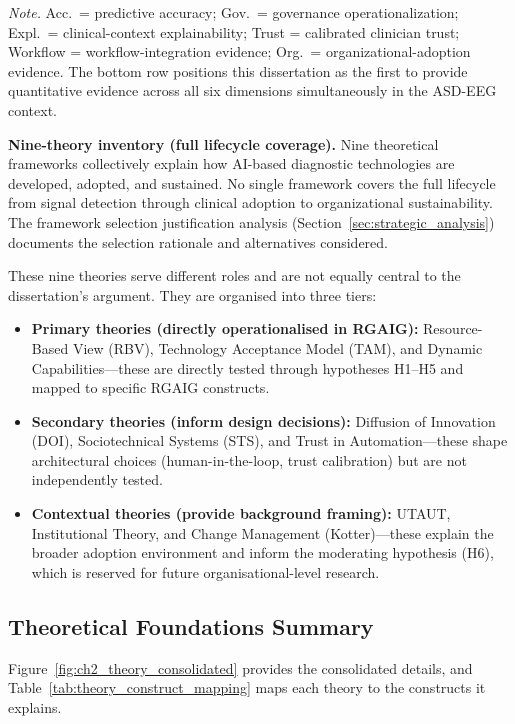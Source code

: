 \vspace{0.4em}
\noindent\textit{Note.} Acc.\ = predictive accuracy; Gov.\ = governance operationalization; Expl.\ = clinical-context explainability; Trust = calibrated clinician trust; Workflow = workflow-integration evidence; Org.\ = organizational-adoption evidence. The bottom row positions this dissertation as the first to provide quantitative evidence across all six dimensions simultaneously in the ASD-EEG context.

\noindent\textbf{Nine-theory inventory (full lifecycle coverage).} Nine theoretical frameworks collectively explain how AI-based diagnostic technologies are developed, adopted, and sustained. No single framework covers the full lifecycle from signal detection through clinical adoption to organizational sustainability. The framework selection justification analysis (Section~\ref{sec:strategic_analysis}) documents the selection rationale and alternatives considered.

These nine theories serve different roles and are not equally central to the dissertation's argument. They are organised into three tiers:

\begin{itemize}
    \item \textbf{Primary theories (directly operationalised in RGAIG):} Resource-Based View (RBV), Technology Acceptance Model (TAM), and Dynamic Capabilities---these are directly tested through hypotheses H1--H5 and mapped to specific RGAIG constructs.
    \item \textbf{Secondary theories (inform design decisions):} Diffusion of Innovation (DOI), Sociotechnical Systems (STS), and Trust in Automation---these shape architectural choices (human-in-the-loop, trust calibration) but are not independently tested.
    \item \textbf{Contextual theories (provide background framing):} UTAUT, Institutional Theory, and Change Management (Kotter)---these explain the broader adoption environment and inform the moderating hypothesis (H6), which is reserved for future organisational-level research.
\end{itemize}

\subsection{Theoretical Foundations Summary}

Figure~\ref{fig:ch2_theory_consolidated} provides the consolidated details, and Table~\ref{tab:theory_construct_mapping} maps each theory to the constructs it explains.

